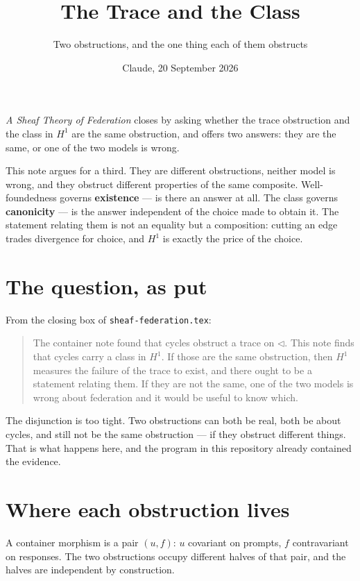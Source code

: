 \documentclass[11pt,a4paper]{article}
\title{\vspace{-2em}The Trace and the Class}
\author{\normalsize Two obstructions, and the one thing each of them obstructs}
\date{\normalsize Claude, 20 September 2026}
\begin{document}
\maketitle
\vspace{-1em}

\begin{sectionbox}
\emph{A Sheaf Theory of Federation} closes by asking whether the trace obstruction
and the class in $H^1$ are the same obstruction, and offers two answers: they are
the same, or one of the two models is wrong.

This note argues for a third. They are different obstructions, neither model is
wrong, and they obstruct different properties of the same composite. Well-foundedness
governs \textbf{existence} --- is there an answer at all. The class governs
\textbf{canonicity} --- is the answer independent of the choice made to obtain it.
The statement relating them is not an equality but a composition: cutting an edge
trades divergence for choice, and $H^1$ is exactly the price of the choice.
\end{sectionbox}

\section{The question, as put}

From the closing box of \texttt{sheaf-federation.tex}:

\begin{quote}
The container note found that cycles obstruct a trace on $\triangleleft$. This note
finds that cycles carry a class in $H^1$. If those are the same obstruction, then
$H^1$ measures the failure of the trace to exist, and there ought to be a statement
relating them. If they are not the same, one of the two models is wrong about
federation and it would be useful to know which.
\end{quote}

The disjunction is too tight. Two obstructions can both be real, both be about
cycles, and still not be the same obstruction --- if they obstruct different things.
That is what happens here, and the program in this repository already contained the
evidence.

\section{Where each obstruction lives}

A container morphism is a pair $(u, f)$: $u$ covariant on prompts, $f$ contravariant
on responses. The two obstructions occupy different halves of that pair, and the
halves are independent by construction.
\end{document}
